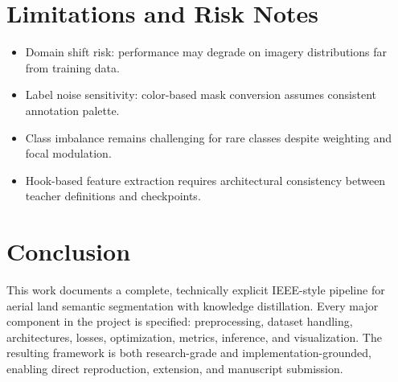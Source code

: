 \documentclass[journal]{IEEEtran}
\begin{document}
\section{Limitations and Risk Notes}
\begin{itemize}
    \item Domain shift risk: performance may degrade on imagery distributions far from training data.
    \item Label noise sensitivity: color-based mask conversion assumes consistent annotation palette.
    \item Class imbalance remains challenging for rare classes despite weighting and focal modulation.
    \item Hook-based feature extraction requires architectural consistency between teacher definitions and checkpoints.
\end{itemize}

\section{Conclusion}
This work documents a complete, technically explicit IEEE-style pipeline for aerial land semantic segmentation with knowledge distillation. Every major component in the project is specified: preprocessing, dataset handling, architectures, losses, optimization, metrics, inference, and visualization. The resulting framework is both research-grade and implementation-grounded, enabling direct reproduction, extension, and manuscript submission.

\appendices
\end{document}
